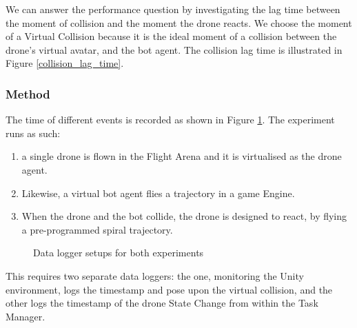 We can answer the performance question by investigating the lag time between the moment of collision and the moment the drone reacts. We choose the moment of a Virtual Collision because it is the ideal moment of a collision between the drone's virtual avatar, and the bot agent. The collision lag time is illustrated in Figure \ref{collision_lag_time}.

\subsubsection{Method} 

The time of different events is recorded as shown in Figure \ref{feedback_loop}. The experiment runs as such: 
\begin{enumerate}
    \item a single drone is flown in the Flight Arena and it is virtualised as the drone agent.
    \item Likewise, a virtual bot agent flies a trajectory in a game Engine. 
    \item When the drone and the bot collide, the drone is designed to react, by flying a pre-programmed spiral trajectory. 
\end{enumerate}


\begin{figure}[!h]
    \raggedright

    \caption{Data logger setups for both experiments}
    \label{feedback_loop}
\end{figure}
This requires two separate data loggers: the one, monitoring the Unity environment, logs the timestamp and pose upon the virtual collision, and the other logs the timestamp of the drone State Change from within the Task Manager. 




